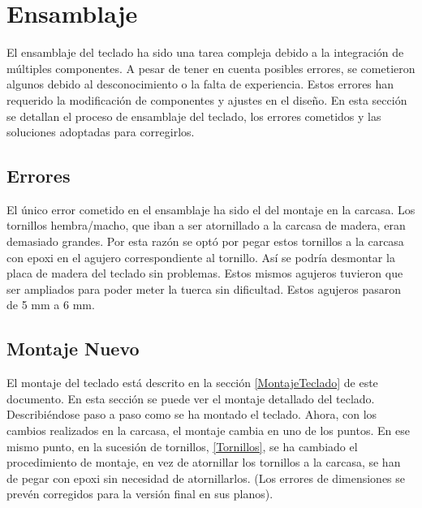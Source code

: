 \section{Ensamblaje}\label{ApendiceEnsamblaje}

El ensamblaje del teclado ha sido una tarea compleja debido a la integración de múltiples componentes. A pesar de tener en cuenta posibles errores, se cometieron algunos debido al desconocimiento o la falta de experiencia. Estos errores han requerido la modificación de componentes y ajustes en el diseño. En esta sección se detallan el proceso de ensamblaje del teclado, los errores cometidos y las soluciones adoptadas para corregirlos.

\subsection{Errores}\label{ApendiceEnsamblajeErrores}

El único error cometido en el ensamblaje ha sido el del montaje en la carcasa. Los tornillos hembra/macho, que iban a ser atornillado a la carcasa de madera, eran demasiado grandes. Por esta razón se optó por pegar estos tornillos a la carcasa con epoxi en el agujero correspondiente al tornillo. Así se podría desmontar la placa de madera del teclado sin problemas. Estos mismos agujeros tuvieron que ser ampliados para poder meter la tuerca sin dificultad. Estos agujeros pasaron de 5 mm a 6 mm.

\subsection{Montaje Nuevo} \label{ApendiceEnsamblajeMontaje}

El montaje del teclado está descrito en la sección \ref{MontajeTeclado} de este documento. En esta sección se puede ver el montaje detallado del teclado. Describiéndose paso a paso como se ha montado el teclado. Ahora, con los cambios realizados en la carcasa, el montaje cambia en uno de los puntos. En ese mismo punto, en la sucesión de tornillos, \ref{Tornillos}, se ha cambiado el procedimiento de montaje, en vez de atornillar los tornillos a la carcasa, se han de pegar con epoxi sin necesidad de atornillarlos. (Los errores de dimensiones se prevén corregidos para la versión final en sus planos).